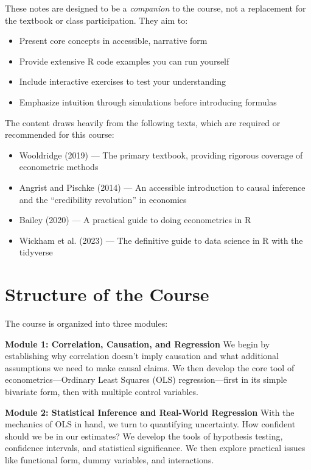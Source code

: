 \documentclass[
  letterpaper,
  DIV=11,
  numbers=noendperiod]{scrreprt}
\providecommand{\tightlist}{%
  \setlength{\itemsep}{0pt}\setlength{\parskip}{0pt}}
\begin{document}
These notes are designed to be a \emph{companion} to the course, not a
replacement for the textbook or class participation. They aim to:

\begin{itemize}
\tightlist
\item
  Present core concepts in accessible, narrative form
\item
  Provide extensive R code examples you can run yourself
\item
  Include interactive exercises to test your understanding
\item
  Emphasize intuition through simulations before introducing formulas
\end{itemize}

The content draws heavily from the following texts, which are required
or recommended for this course:

\begin{itemize}
\tightlist
\item
  Wooldridge (2019) --- The primary textbook, providing rigorous
  coverage of econometric methods
\item
  Angrist and Pischke (2014) --- An accessible introduction to causal
  inference and the ``credibility revolution'' in economics
\item
  Bailey (2020) --- A practical guide to doing econometrics in R
\item
  Wickham et al. (2023) --- The definitive guide to data science in R
  with the tidyverse
\end{itemize}

\section*{Structure of the Course}\label{structure-of-the-course}


The course is organized into three modules:

\textbf{Module 1: Correlation, Causation, and Regression} We begin by
establishing why correlation doesn't imply causation and what additional
assumptions we need to make causal claims. We then develop the core tool
of econometrics---Ordinary Least Squares (OLS) regression---first in its
simple bivariate form, then with multiple control variables.

\textbf{Module 2: Statistical Inference and Real-World Regression} With
the mechanics of OLS in hand, we turn to quantifying uncertainty. How
confident should we be in our estimates? We develop the tools of
hypothesis testing, confidence intervals, and statistical significance.
We then explore practical issues like functional form, dummy variables,
and interactions.
\end{document}
